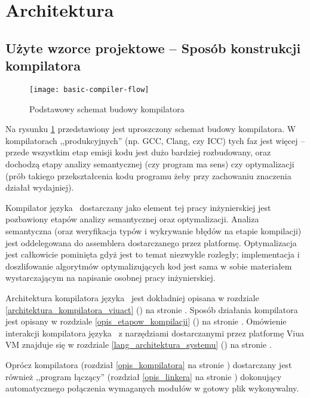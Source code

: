 \section{Architektura}

\subsection{Użyte wzorce projektowe -- Sposób konstrukcji kompilatora}

\begin{figure}[!htp]
    \centering
    \texttt{[image: basic-compiler-flow]}
    \caption{Podstawowy schemat budowy kompilatora}
    \label{basic_compiler_flow}
\end{figure}

Na rysunku \ref{basic_compiler_flow} przedstawiony jest uproszczony schemat budowy kompilatora.
W kompilatorach ,,produkcyjnych'' (np. GCC, Clang, czy ICC) tych faz jest więcej -- przede wszystkim etap
emisji kodu jest dużo bardziej rozbudowany, oraz dochodzą etapy analizy semantycznej (czy program ma sens) czy
optymalizacji (prób takiego przekształcenia kodu programu żeby przy zachowaniu znaczenia działał wydajniej).

Kompilator języka \ViuAct\ dostarczany jako element tej pracy inżynierskiej jest pozbawiony etapów
analizy semantycznej oraz optymalizacji. Analiza semantyczna (oraz weryfikacja typów i wykrywanie błędów na
etapie kompilacji) jest oddelegowana do assemblera dostarczanego przez platformę. Optymalizacja jest
całkowicie pominięta gdyż jest to temat niezwykle rozległy; implementacja i doszlifowanie algorytmów
optymalizujących kod jest sama w sobie materiałem wystarczającym na napisanie osobnej pracy inżynierskiej.

Architektura kompilatora języka \ViuAct\ jest dokładniej opisana w rozdziale
\ref{architektura_kompilatora_viuact} () na
stronie \pageref{architektura_kompilatora_viuact}.
Sposób działania kompilatora jest opisany w rozdziale \ref{opis_etapow_kompilacji}
() na stronie \pageref{opis_etapow_kompilacji}.
Omówienie interakcji kompilatora języka \ViuAct\ z narzędziami dostarczanymi przez platformę Viua VM znajduje
się w rozdziale \ref{lang_architektura_systemu} () na stronie
\pageref{lang_architektura_systemu}.

Oprócz kompilatora (rozdział \ref{opis_kompilatora} na stronie \pageref{opis_kompilatora}) dostarczany jest
również ,,program łączący'' (rozdział \ref{opis_linkera} na stronie \pageref{opis_linkera}) dokonujący
automatycznego połączenia wymaganych modułów w gotowy plik wykonywalny.

